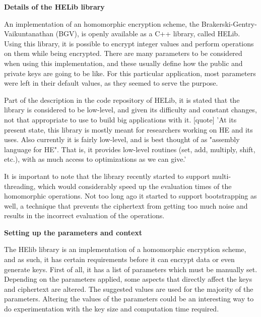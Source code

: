 

\textbf{Details of the HELib library}

An implementation of an homomorphic encryption scheme, the Brakerski-Gentry-Vaikuntanathan (BGV), is openly available as a C++ library, called HELib. Using this library, it is possible to encrypt integer values and perform operations on them while being encrypted. There are many parameters to be considered when using this implementation, and these usually define how the public and private keys are going to be like. For this particular application, most parameters were left in their default values, as they seemed to serve the purpose. 

Part of the description in the code repository of HELib, it is stated that the library is considered to be low-level, and given its difficulty and constant changes, not that appropriate to use to build big applications with it.  [quote] 'At its present state, this library is mostly meant for researchers working on HE and its uses. Also currently it is fairly low-level, and is best thought of as "assembly language for HE". That is, it provides low-level routines (set, add, multiply, shift, etc.), with as much access to optimizations as we can give.'

It is important to note that the library recently started to support multi-threading, which would considerably speed up the evaluation times of the homomorphic operations. Not too long ago it started to support bootstrapping as well, a technique that prevents the ciphertext from getting too much noise and results in the incorrect evaluation of the operations.

\textbf{Setting up the parameters and context}

The HElib library is an implementation of a homomorphic encryption scheme, and as such, it has certain requirements before it can encrypt data or even generate keys. First of all, it has a list of parameters which must be manually set. Depending on the parameters applied, some aspects that directly affect the keys and ciphertext are altered. The suggested values are used for the majority of the parameters. Altering the values of the parameters could be an interesting way to do experimentation with the key size and computation time required.

